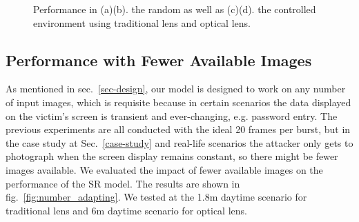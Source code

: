 \begin{figure}[!t]
    \centering
    \hfill
    \caption{Performance in (a)(b). the random as well as (c)(d). the controlled environment using traditional lens and optical lens.}
    \label{fig:control_random}
\end{figure}


\subsection{Performance with Fewer Available Images}
As mentioned in sec.~\ref{sec-design}, our model is designed to work on any number of input images, which is requisite because in certain scenarios the data displayed on the victim's screen is transient and ever-changing, e.g. password entry. The previous experiments are all conducted with the ideal 20 frames per burst, but in the case study at Sec.~\ref{case-study} and real-life scenarios the attacker only gets to photograph when the screen display remains constant, so there might be fewer images available. We evaluated the impact of fewer available images on the performance of the SR model. The results are shown in fig.~\ref{fig:number_adapting}. We tested at the 1.8m daytime scenario for traditional lens and 6m daytime scenario for optical lens.

